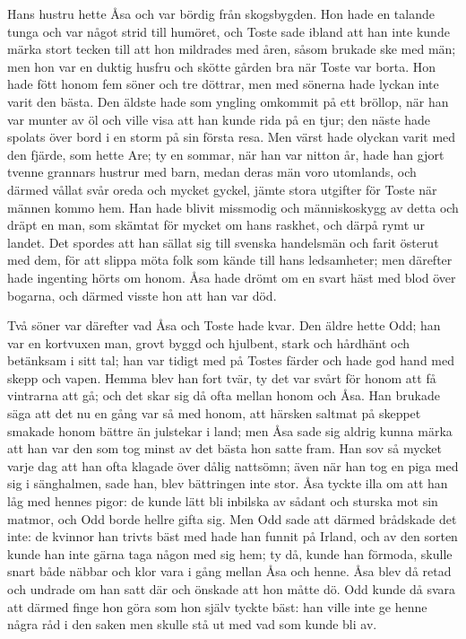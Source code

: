 \initial Hans hustru hette Åsa och var bördig från skogsbygden. Hon hade en talande tunga och var något strid till humöret, och Toste sade ibland att han inte kunde märka stort tecken till att hon mildrades med åren, såsom brukade ske med män; men hon var en duktig husfru och skötte gården bra när Toste var borta. Hon hade fött honom fem söner och tre döttrar, men med sönerna hade lyckan inte varit den bästa. Den äldste hade som yngling omkommit på ett bröllop, när han var munter av öl och ville visa att han kunde rida på en tjur; den näste hade spolats över bord i en storm på sin första resa. Men värst hade olyckan varit med den fjärde, som hette Are; ty en sommar, när han var nitton år, hade han gjort tvenne grannars hustrur med barn, medan deras män voro utomlands, och därmed vållat svår oreda och mycket gyckel, jämte stora utgifter för Toste när männen kommo hem. Han hade blivit missmodig och människoskygg av detta och dräpt en man, som skämtat för mycket om hans raskhet, och därpå rymt ur landet. Det spordes att han sällat sig till svenska handelsmän och farit österut med dem, för att slippa möta folk som kände till hans ledsamheter; men därefter hade ingenting hörts om honom. Åsa hade drömt om en svart häst med blod över bogarna, och därmed visste hon att han var död.

\initial Två söner var därefter vad Åsa och Toste hade kvar. Den äldre hette Odd; han var en kortvuxen man, grovt byggd och hjulbent, stark och hårdhänt och betänksam i sitt tal; han var tidigt med på Tostes färder och hade god hand med skepp och vapen. Hemma blev han fort tvär, ty det var svårt för honom att få vintrarna att gå; och det skar sig då ofta mellan honom och Åsa. Han brukade säga att det nu en gång var så med honom, att härsken saltmat på skeppet smakade honom bättre än julstekar i land; men Åsa sade sig aldrig kunna märka att han var den som tog minst av det bästa hon satte fram. Han sov så mycket varje dag att han ofta klagade över dålig nattsömn; även när han tog en piga med sig i sänghalmen, sade han, blev bättringen inte stor. Åsa tyckte illa om att han låg med hennes pigor: de kunde lätt bli inbilska av sådant och sturska mot sin matmor, och Odd borde hellre gifta sig. Men Odd sade att därmed brådskade det inte: de kvinnor han trivts bäst med hade han funnit på Irland, och av den sorten kunde han inte gärna taga någon med sig hem; ty då, kunde han förmoda, skulle snart både näbbar och klor vara i gång mellan Åsa och henne. Åsa blev då retad och undrade om han satt där och önskade att hon måtte dö. Odd kunde då svara att därmed finge hon göra som hon själv tyckte bäst: han ville inte ge henne några råd i den saken men skulle stå ut med vad som kunde bli av.

